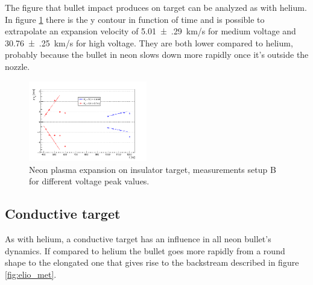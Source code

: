 The figure that bullet impact produces on target can be analyzed as with helium. In figure \ref{fig:neon_c_ylim} there is the y contour in function of time and is possible to extrapolate an expansion velocity of \SI{5.01(29)}{\kilo\meter/\second} for medium voltage and \SI{30.76(25)}{\kilo\meter/\second} for high voltage. They are both lower compared to helium, probably because the bullet in neon slows down more rapidly once it's outside the nozzle.
\begin{figure}
 \centering
 \includegraphics[width=0.46\textwidth]{Images/Shape/neon_c_ylim.png}
 \caption{Neon plasma expansion on insulator target, measurements setup B for different voltage peak values.}
 \label{fig:neon_c_ylim}
\end{figure}


\subsection{Conductive target}
As with helium, a conductive target has an influence in all neon bullet's dynamics. If compared to helium the bullet goes more rapidly from a round shape to the elongated one that gives rise to the backstream described in figure \ref{fig:elio_met}.

